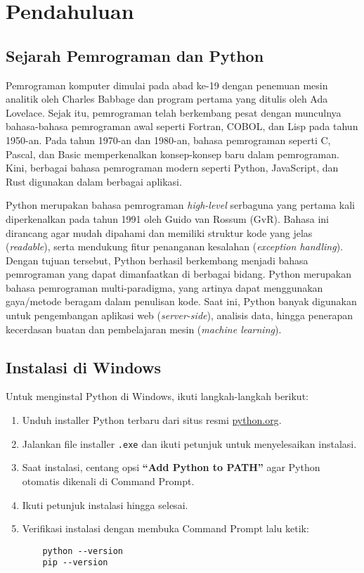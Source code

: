 \chapter{Pendahuluan}

\section{Sejarah Pemrograman dan Python}

Pemrograman komputer dimulai pada abad ke-19 dengan penemuan mesin analitik oleh Charles Babbage dan program pertama yang ditulis oleh Ada Lovelace. Sejak itu, pemrograman telah berkembang pesat dengan munculnya bahasa-bahasa pemrograman awal seperti Fortran, COBOL, dan Lisp pada tahun 1950-an. Pada tahun 1970-an dan 1980-an, bahasa pemrograman seperti C, Pascal, dan Basic memperkenalkan konsep-konsep baru dalam pemrograman. Kini, berbagai bahasa pemrograman modern seperti Python, JavaScript, dan Rust digunakan dalam berbagai aplikasi.

Python merupakan bahasa pemrograman \textit{high-level} serbaguna yang pertama kali diperkenalkan pada tahun 1991 oleh Guido van Rossum (GvR). Bahasa ini dirancang agar mudah dipahami dan memiliki struktur kode yang jelas (\textit{readable}), serta mendukung fitur penanganan kesalahan (\textit{exception handling}). Dengan tujuan tersebut, Python berhasil berkembang menjadi bahasa pemrograman yang dapat dimanfaatkan di berbagai bidang. Python merupakan bahasa pemrograman multi-paradigma, yang artinya dapat menggunakan gaya/metode beragam dalam penulisan kode. Saat ini, Python banyak digunakan untuk pengembangan aplikasi web (\textit{server-side}), analisis data, hingga penerapan kecerdasan buatan dan pembelajaran mesin (\textit{machine learning}).
\section{Instalasi di Windows}

Untuk menginstal Python di Windows, ikuti langkah-langkah berikut:

\begin{enumerate}
\item Unduh installer Python terbaru dari situs resmi \href{https://www.python.org/downloads/}{python.org}.
\item Jalankan file installer \texttt{.exe} dan ikuti petunjuk untuk menyelesaikan instalasi.
\item Saat instalasi, centang opsi \textbf{``Add Python to PATH''} agar Python otomatis dikenali di Command Prompt.
\item Ikuti petunjuk instalasi hingga selesai.
\item Verifikasi instalasi dengan membuka Command Prompt lalu ketik:
\begin{verbatim}
    python --version
    pip --version
\end{verbatim}
\end{enumerate}

